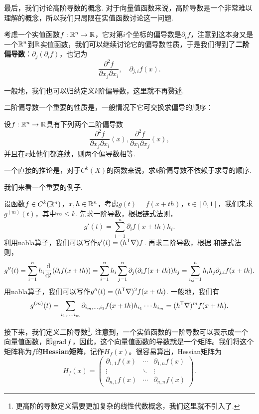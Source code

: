 最后，我们讨论高阶导数的概念. 对于向量值函数来说，高阶导数是一个非常难以理解的概念，所以我们只局限在实值函数讨论这一问题. 

考虑一个实值函数$f:\mathbb{R}^n\to\mathbb{R}$，它对第$i$个坐标的偏导数是$\partial_i f$，注意到这本身又是一个$\mathbb{R}^n$到$\mathbb{R}$实值函数，我们可以继续讨论它的偏导数性质，于是我们得到了\textbf{二阶偏导数}：$\partial_j(\partial_i f)$，也记为
\[\frac{\partial^2 f}{\partial x_j\partial x_i},\quad\partial_{j,i} f(x).\]

一般地，我们也可以归纳定义$k$阶偏导数，这里就不再赘述. 

二阶偏导数一个重要的性质是，一般情况下它可交换求偏导的顺序：

\begin{proposition}\label{prop:partial-commute}
    设$f:\mathbb{R}^n\to\mathbb{R}$具有下列两个二阶偏导数
    \[\frac{\partial^2 f}{\partial x_j\partial x_i}(x),\frac{\partial^2 f}{\partial x_i\partial x_j}(x),\]
    并且在$x$处他们都连续，则两个偏导数相等.
\end{proposition}

一个直接的推论是，对于$C^k(X)$的函数来说，求$k$阶偏导数不依赖于求导的顺序. 

我们来看一个重要的例子. 
\begin{example}\label{ex:multi-taylor}
设函数$f\in C^k(\mathbb{R}^n)$，$x,h\in\mathbb{R}^n$，考虑$g(t)=f(x+th)$，$t\in[0,1]$，我们来求$g^{(m)}(t)$，其中$m\leq k$. 先求一阶导数，根据链式法则，
\[g'(t)=\sum_{i=1}^n\partial_i f(x+th)h_i.\]
利用nabla算子，我们可以写作$g'(t)=(h^{\mathsf{T}}\nabla) f$.
再求二阶导数，根据 和链式法则，
\[g''(t)=\sum_{i=1}^nh_i\frac{\mathrm{d}}{\mathrm{d} t}(\partial_i f(x+th))=\sum_{i=1}^nh_i\sum_{j=1}^n\partial_j(\partial_i f(x+th))h_j=\sum_{i,j=1}^nh_ih_j\partial_{j,i}f(x+th).\]
用nabla算子，我们可以写作$g''(t)=(h^{\mathsf{T}}\nabla)^2f(x+th)$. 一般地，我们有
\[g^{(m)}(t)=\sum_{i_1,\dots,i_m}\partial_{i_m,\dots,i_1}f(x+th)h_{i_1}\cdots h_{i_m}=(h^{\mathsf{T}}\nabla)^mf(x+th).\]
\end{example}

接下来，我们定义二阶导数\footnote{更高阶的导数定义需要更加复杂的线性代数概念，我们这里就不引入了. }. 注意到，一个实值函数的一阶导数可以表示成一个向量值函数，即$\operatorname*{grad} f$，因此，这个向量值函数的导数就是一个矩阵。我们将这个矩阵称为$f$的\textbf{Hessian矩阵}，记作$H_f(x)$。很容易算出，Hessian矩阵为
\[H_f(x)=\begin{pmatrix}
    \partial_{1,1}f(x) & \cdots & \partial_{1,n}f(x) \\
    \vdots & \ddots & \vdots \\
    \partial_{n,1}f(x) & \cdots & \partial_{n,n}f(x)
\end{pmatrix}.\]

